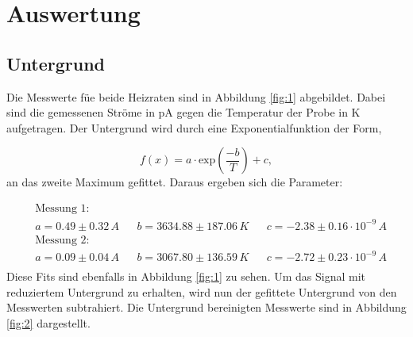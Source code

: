 \newpage
\section{Auswertung}
\label{sec:Auswertung}

\subsection{Untergrund}
\label{sec:Untergrund}
Die Messwerte füe beide Heizraten sind in Abbildung \ref{fig:1} abgebildet. 
Dabei sind die gemessenen Ströme in pA gegen die Temperatur der Probe in K aufgetragen.
Der Untergrund wird durch eine Exponentialfunktion der Form,

\begin{equation}
    f(x) = a \cdot \text{exp} \left( \frac{-b}{T} \right) + c,
\end{equation}
an das zweite Maximum gefittet.
Daraus ergeben sich die Parameter: 

\begin{align*}
    &\text{Messung 1:}\\
    & a = 0.49 \pm 0.32 \,A    &&  b = 3634.88 \pm 187.06 \,K    &&  c = -2.38 \pm 0.16 \cdot 10^{-9}\,A \\
    &\text{Messung 2:}\\
    & a = 0.09 \pm 0.04 \,A    &&  b = 3067.80 \pm 136.59 \,K    &&  c = -2.72 \pm 0.23 \cdot 10^{-9}\,A \\
\end{align*}
Diese Fits sind ebenfalls in Abbildung \ref{fig:1} zu sehen.
Um das Signal mit reduziertem Untergrund zu erhalten, wird nun der gefittete Untergrund von den Messwerten subtrahiert.
Die Untergrund bereinigten Messwerte sind in Abbildung \ref{fig:2} dargestellt.

